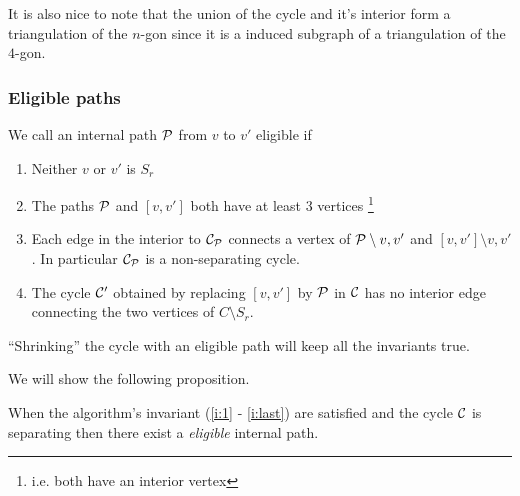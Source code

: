 It is also nice to note that the union of the cycle and it's interior form a triangulation of the $n$-gon since it is a induced subgraph of a triangulation of the $4$-gon.


\subsubsection{Eligible paths}



\begin{defi}
We call an internal path $\P$ from $v$ to $v'$ eligible if 
\begin{enumerate}
 \renewcommand*{\labelenumi}{(E\arabic{enumi})}%
 \renewcommand*{\theenumi}{(E\arabic{enumi})}%


\item Neither $v$ or $v'$ is $S_r$ \label{e:notSr}
\item The paths $\P$ and $[v,v']$ both have at least 3 vertices \footnote{i.e. both have an interior vertex} \label{e:length2borders}
\item Each edge in the interior to $\C_\P$ connects a vertex of $\P\setminus{v,v'}$ and $[v,v']\setminus{v,v'}$. In particular $\C_\P$ is a non-separating cycle.
\label{e:crossingedge}
\item The cycle $\C'$ obtained by replacing $[v,v']$ by $\P$ in $\C$ has no interior edge connecting the two vertices of $C\setminus{S_r}$.
\label{e:noChordinC'}
\end{enumerate}
\end{defi}

\begin{remark}
``Shrinking'' the cycle with an eligible path will keep all the invariants true.
\end{remark}

We will show the following proposition.

\begin{thrm}
\label{th:eligExistence}
When the algorithm's invariant (\ref{i:1} - \ref{i:last}) are satisfied and the cycle $\C$ is separating then there exist a \emph{eligible} internal path.
\end{thrm}

